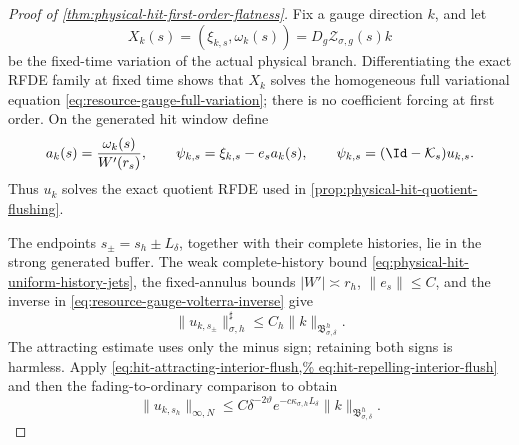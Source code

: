 \begin{proof}[Proof of
\cref{thm:physical-hit-first-order-flatness}]
Fix a gauge direction \(k\), and let
\[
 X_k(s)=(\xi_{k,s},\omega_k(s))
 =D_g\mathcal Z_{\sigma,g}(s)k
\]
be the fixed-time variation of the actual physical branch.  Differentiating
the exact RFDE family at fixed time shows that \(X_k\) solves the homogeneous
full variational equation
\cref{eq:resource-gauge-full-variation}; there is no coefficient forcing
at first order.  On the generated hit window define
\begin{equation}
 a_k(s)=\frac{\omega_k(s)}{W'(r_s)},\qquad
 \psi_{k,s}=\xi_{k,s}-e_sa_k(s),\qquad
 \psi_{k,s}=(\Id-\mathcal K_s)u_{k,s}.             \label{eq:proof-hit-gauge-quotient-coordinates}
\end{equation}
Thus \(u_k\) solves the exact quotient RFDE used in
\cref{prop:physical-hit-quotient-flushing}.

The endpoints \(s_\pm=s_h\pm L_\delta\), together with their complete
histories, lie in the strong generated buffer.  The weak complete-history
bound \cref{eq:physical-hit-uniform-history-jets}, the fixed-annulus
bounds \(|W'|\asymp r_h\), \(\|e_s\|\le C\), and the inverse in
\cref{eq:resource-gauge-volterra-inverse} give
\begin{equation}
 \|u_{k,s_\pm}\|_{\sigma,h}^{\sharp}
 \le C_h\|k\|_{\mathfrak B_{\sigma,\delta}^h}.     \label{eq:proof-hit-gauge-endpoint-bound}
\end{equation}
The attracting estimate uses only the minus sign; retaining both signs is
harmless.  Apply
\cref{eq:hit-attracting-interior-flush,%
eq:hit-repelling-interior-flush} and then the fading-to-ordinary comparison
to obtain
\begin{equation}
 \|u_{k,s_h}\|_{\infty,N}
 \le C\delta^{-2\vartheta}
       e^{-c\kappa_{\sigma,h}L_\delta}
       \|k\|_{\mathfrak B_{\sigma,\delta}^h}.      \label{eq:proof-hit-gauge-center-bound}
\end{equation}


\end{proof}
